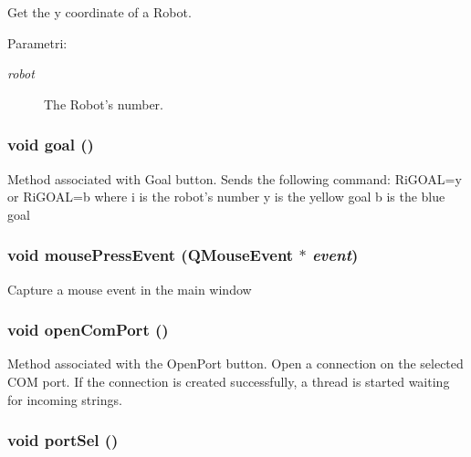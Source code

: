 Get the y coordinate of a Robot. \begin{Desc}
\item[Parametri:]
\begin{description}
\item[{\em robot}]The Robot's number. \end{description}
\end{Desc}
\hypertarget{classMainWindow_b20c1e3dbb16cd45ef4f697ce0fb11f7}{
\subsubsection[goal]{\setlength{\rightskip}{0pt plus 5cm}void goal ()}}
\label{classMainWindow_b20c1e3dbb16cd45ef4f697ce0fb11f7}


Method associated with Goal button. Sends the following command: Ri\-GOAL=y or Ri\-GOAL=b where i is the robot's number y is the yellow goal b is the blue goal \hypertarget{classMainWindow_d2272e344e46519f026cd02f419884f1}{
\subsubsection[mousePressEvent]{\setlength{\rightskip}{0pt plus 5cm}void mouse\-Press\-Event (QMouse\-Event $\ast$ {\em event})}}
\label{classMainWindow_d2272e344e46519f026cd02f419884f1}


Capture a mouse event in the main window \hypertarget{classMainWindow_faf58be398c427554d4bef465eff4be0}{
\subsubsection[openComPort]{\setlength{\rightskip}{0pt plus 5cm}void open\-Com\-Port ()}}
\label{classMainWindow_faf58be398c427554d4bef465eff4be0}


Method associated with the Open\-Port button. Open a connection on the selected COM port. If the connection is created successfully, a thread is started waiting for incoming strings. \hypertarget{classMainWindow_7fea2f4466d9b971fbe4142743a8e3cb}{
\subsubsection[portSel]{\setlength{\rightskip}{0pt plus 5cm}void port\-Sel ()}}
\label{classMainWindow_7fea2f4466d9b971fbe4142743a8e3cb}


